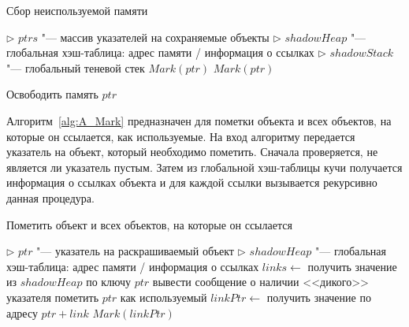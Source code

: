 \begin{breakablealgorithm}
    \caption{Сбор неиспользуемой памяти}
    \label{alg:A_GC}
    \begin{algorithmic}[1]
            \Statex $\triangleright$ $ptrs$ "--- массив указателей на сохраняемые объекты
            \Statex $\triangleright$ $shadowHeap$ "--- глобальная хэш-таблица: адрес памяти / информация о ссылках
            \Statex $\triangleright$ $shadowStack$ "--- глобальный теневой стек
            \Statex
                \State $Mark(ptr)$
            \EndFor
                    \State $Mark(ptr)$
                \EndFor
            \EndFor

                \State Освободить память $ptr$
            \EndFor
        \EndFunction
    \end{algorithmic}
\end{breakablealgorithm}

Алгоритм~\ref{alg:A_Mark} предназначен для пометки объекта и всех объектов, на которые он ссылается, как используемые.
На вход алгоритму передается указатель на объект, который необходимо пометить.
Сначала проверяется, не является ли указатель пустым.
Затем из глобальной хэш-таблицы кучи получается информация о ссылках объекта и для каждой ссылки вызывается рекурсивно данная процедура.

\begin{breakablealgorithm}
    \caption{Пометить объект и всех объектов, на которые он ссылается}
    \label{alg:A_Mark}

    \begin{algorithmic}[1]
            \Statex $\triangleright$ $ptr$ "--- указатель на раскрашиваемый объект
            \Statex $\triangleright$ $shadowHeap$ "--- глобальная хэш-таблица: адрес памяти / информация о ссылках
            \Statex
                \State \Return
            \EndIf
            \State $links \leftarrow$ получить значение из $shadowHeap$ по ключу $ptr$
                \State вывести сообщение о наличии <<дикого>> указателя
                \State \Return
            \EndIf
                \State \Return
            \EndIf
            \State пометить $ptr$ как используемый
                \State $linkPtr \leftarrow$ получить значение по адресу $ptr + link$
                \State $Mark(linkPtr)$
            \EndFor

            \State \Return

        \EndFunction
    \end{algorithmic}
\end{breakablealgorithm}

